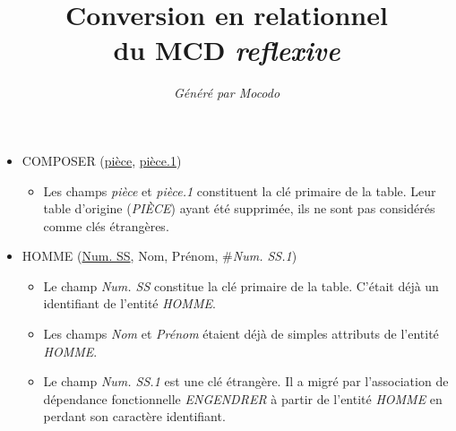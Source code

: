 \documentclass[a4paper]{article}
\title{Conversion en relationnel\\du MCD \emph{reflexive}}
\author{\emph{Généré par Mocodo}}
\newcommand{\relat}[1]{\textsc{#1}}
\newcommand{\attr}[1]{#1}
\newcommand{\prim}[1]{\uline{#1}}
\newcommand{\foreign}[1]{\#\textsl{#1}}
\begin{document}
\maketitle

\begin{itemize}
  \item \relat{COMPOSER} (\prim{pièce}, \prim{pièce.1})
  \begin{itemize}
    \item Les champs \emph{pièce} et \emph{pièce.1} constituent la clé primaire de la table. Leur table d'origine (\emph{PIÈCE}) ayant été supprimée, ils ne sont pas considérés comme clés étrangères.
  \end{itemize}

  \item \relat{HOMME} (\prim{Num. SS}, \attr{Nom}, \attr{Prénom}, \foreign{Num. SS.1})
  \begin{itemize}
    \item Le champ \emph{Num. SS} constitue la clé primaire de la table. C'était déjà un identifiant de l'entité \emph{HOMME}.
    \item Les champs \emph{Nom} et \emph{Prénom} étaient déjà de simples attributs de l'entité \emph{HOMME}.
    \item Le champ \emph{Num. SS.1} est une clé étrangère. Il a migré par l'association de dépendance fonctionnelle \emph{ENGENDRER} à partir de l'entité \emph{HOMME} en perdant son caractère identifiant.
  \end{itemize}

\end{itemize}
\end{document}
